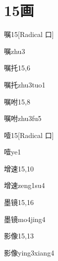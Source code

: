 
\section*{15画}

\begin{entry}{嘱}{15}[Radical 口]
  \begin{phonetics}{嘱}{zhu3}
  \end{phonetics}
\end{entry}

\begin{entry}{嘱托}{15,6}
  \begin{phonetics}{嘱托}{zhu3tuo1}
  \end{phonetics}
\end{entry}

\begin{entry}{嘱咐}{15,8}
  \begin{phonetics}{嘱咐}{zhu3fu5}
  \end{phonetics}
\end{entry}

\begin{entry}{噎}{15}[Radical 口]
  \begin{phonetics}{噎}{ye1}
  \end{phonetics}
\end{entry}

\begin{entry}{增速}{15,10}
  \begin{phonetics}{增速}{zeng1su4}
  \end{phonetics}
\end{entry}

\begin{entry}{墨镜}{15,16}
  \begin{phonetics}{墨镜}{mo4jing4}
  \end{phonetics}
\end{entry}

\begin{entry}{影像}{15,13}
  \begin{phonetics}{影像}{ying3xiang4}
  \end{phonetics}
\end{entry}

